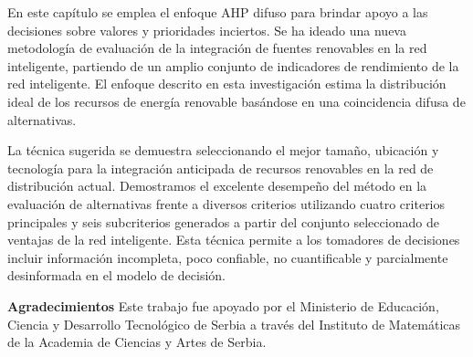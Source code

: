 \documentclass[
]{article}
\begin{document}
En este capítulo se emplea el enfoque AHP difuso para brindar apoyo a
las decisiones sobre valores y prioridades inciertos. Se ha ideado una
nueva metodología de evaluación de la integración de fuentes renovables
en la red inteligente, partiendo de un amplio conjunto de indicadores de
rendimiento de la red inteligente. El enfoque descrito en esta
investigación estima la distribución ideal de los recursos de energía
renovable basándose en una coincidencia difusa de alternativas.

La técnica sugerida se demuestra seleccionando el mejor tamaño,
ubicación y tecnología para la integración anticipada de recursos
renovables en la red de distribución actual. Demostramos el excelente
desempeño del método en la evaluación de alternativas frente a diversos
criterios utilizando cuatro criterios principales y seis subcriterios
generados a partir del conjunto seleccionado de ventajas de la red
inteligente. Esta técnica permite a los tomadores de decisiones incluir
información incompleta, poco confiable, no cuantificable y parcialmente
desinformada en el modelo de decisión.

\textbf{Agradecimientos} Este trabajo fue apoyado por el Ministerio de
Educación, Ciencia y Desarrollo Tecnológico de Serbia a través del
Instituto de Matemáticas de la Academia de Ciencias y Artes de Serbia.
\end{document}

